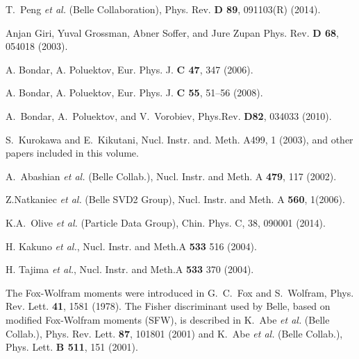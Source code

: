 \documentclass[preprint,aps,showpacs]{revtex4}
\begin{document}
\begin{thebibliography}{99}
T.~Peng {\it et al.} (Belle Collaboration), Phys. Rev. {\bf D 89}, 091103(R) (2014).

Anjan Giri, Yuval Grossman, Abner Soffer, and Jure Zupan Phys. Rev. {\bf D 68}, 054018 (2003).

A. Bondar, A. Poluektov, Eur. Phys. J. {\bf C 47}, 347 (2006).

A. Bondar, A. Poluektov, Eur. Phys. J. {\bf C 55}, 51–56 (2008).

A.~Bondar, A.~Poluektov, and V.~Vorobiev, Phys.Rev. {\bf D82}, 034033 (2010).

S.~Kurokawa and E.~Kikutani, Nucl. Instr. and. Meth. A499, 1 (2003),
and other papers included in this volume.

A.~Abashian {\it et al.} (Belle Collab.),
Nucl. Instr. and Meth. A {\bf 479}, 117 (2002).

 Z.Natkaniec {\it et al.} (Belle SVD2 Group), Nucl. Instr. and Meth. A {\bf 560}, 1(2006).

K.A.~Olive {\it et al.} (Particle Data Group), Chin. Phys. C, 38, 090001 (2014).

H. Kakuno {\it et al.}, Nucl. Instr. and Meth.A {\bf 533} 516 (2004). 

H. Tajima {\it et al.}, Nucl. Instr. and Meth.A {\bf 533} 370 (2004). 



 The Fox-Wolfram moments were introduced in
 G.~C.~Fox and S.~Wolfram, Phys. Rev. Lett. {\bf 41}, 1581 (1978).
 The Fisher discriminant used by Belle, based on modified Fox-Wolfram
 moments (SFW), is described in 
 K.~Abe {\it et al.} (Belle Collab.), Phys. Rev. Lett. {\bf 87},
 101801 (2001) and
 K.~Abe {\it et al.} (Belle Collab.), Phys. Lett. {\bf B 511}, 151
 (2001). 


\end{thebibliography}
\end{document}
